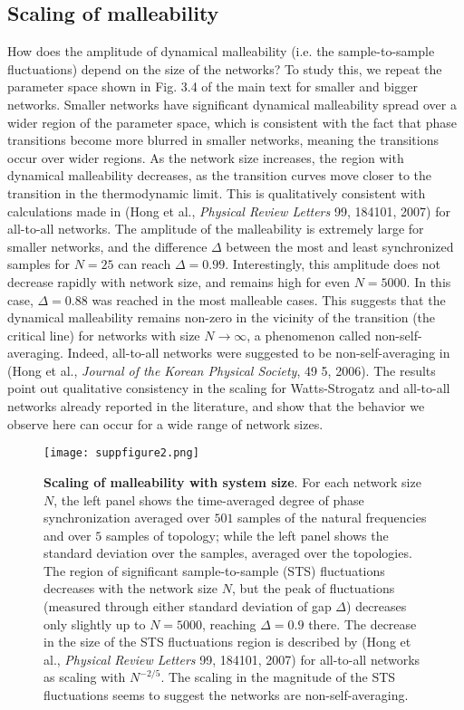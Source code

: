\subsection*{Scaling of malleability}
How does the amplitude of dynamical malleability (i.e. the sample-to-sample fluctuations) depend on the size of the networks? To study this, we repeat the parameter space shown in Fig. 3.4 of the main text for smaller and bigger networks. Smaller networks have significant dynamical malleability spread over a wider region of the parameter space, which is consistent with the fact that phase transitions become more blurred in smaller networks, meaning the transitions occur over wider regions. As the network size increases, the region with dynamical malleability decreases, as the transition curves move closer to the transition in the thermodynamic limit. This is qualitatively consistent with calculations made in (Hong et al., \textit{Physical Review Letters} 99, 184101, 2007) for all-to-all networks. The amplitude of the malleability is extremely large for smaller networks, and the difference $\Delta$ between the most and least synchronized samples for $N = 25$ can reach $\Delta = 0.99$. Interestingly, this amplitude does not decrease rapidly with network size, and remains high for even $N = 5000$. In this case, $\Delta = 0.88$ was reached in the most malleable cases.  This suggests that the dynamical malleability remains non-zero in the vicinity of the transition (the critical line) for networks with size $N\to\infty$, a phenomenon called non-self-averaging. Indeed, all-to-all networks were suggested to be non-self-averaging in (Hong et al., \textit{Journal of the Korean Physical Society}, 49 5, 2006). The results point out qualitative consistency in the scaling for Watts-Strogatz and all-to-all networks already reported in the literature, and show that the behavior we observe here can occur for a wide range of network sizes.

\begin{figure*}[htb]
    \centering
    \texttt{[image: suppfigure2.png]}
    \caption{\textbf{Scaling of malleability with system size}. For each network size $N$, the left panel shows the time-averaged degree of phase synchronization averaged over $501$ samples of the natural frequencies and over $5$ samples of topology; while the left panel shows the standard deviation over the samples, averaged over the topologies. The region of significant sample-to-sample (STS) fluctuations decreases with the network size $N$, but the peak of fluctuations (measured through either standard deviation of gap $\Delta$) decreases only slightly up to $N = 5000$, reaching $\Delta = 0.9$ there. The decrease in the size of the STS fluctuations region is described by (Hong et al., \textit{Physical Review Letters} 99, 184101, 2007) for all-to-all networks as scaling with $N^{-2/5}$. The scaling in the magnitude of the STS fluctuations seems to suggest the networks are non-self-averaging. }
    \label{sup:fig:scaling}
\end{figure*}

